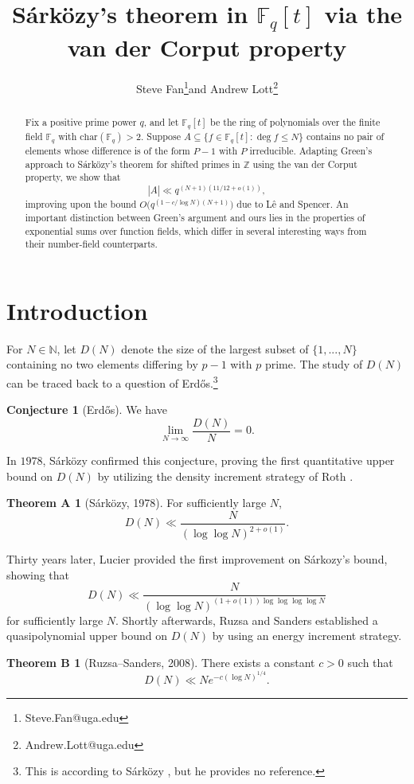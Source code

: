 \documentclass{article}
\title{Sárközy's theorem in $\mathbb{F}_q[t]$ via the van der Corput property}
\author{Steve Fan\thanks{Steve.Fan@uga.edu}\quad and Andrew Lott\thanks{Andrew.Lott@uga.edu}}
\affil{Department of Mathematics\\ University of Georgia\\ Athens, GA 30602}
\date{}
\theoremstyle{definition}
\newtheorem*{conj}{Conjecture}
\newtheorem*{thmB}{Theorem B}
\newtheorem*{thmA}{Theorem A}
\theoremstyle{definition}
\theoremstyle{remark}
\newcommand{\Z}{\mathbb{Z}}
\newcommand{\F}{\mathbb{F}_q[t]}
\newcommand{\1}{\mathbf{1}}
\numberwithin{equation}{section}
\begin{document}
\maketitle

\begin{abstract}
Fix a positive prime power $q$, and  let $\F$ be the ring of polynomials over the finite field $\mathbb{F}_q$ with $\text{char}(\mathbb{F}_q)>2$. Suppose $A \subseteq \{f \in \F : \deg f \leq N\}$ contains no pair of elements whose difference is of the form $P-1$ with $P$ irreducible. Adapting Green’s approach to Sárközy’s theorem for shifted primes in $\Z$ using the van der Corput property, we show that
\[
|A| \ll q^{(N+1)(11/12+o(1))},
\]
improving upon the bound $O\big(q^{(1-c/\log N)(N+1)}\big)$ due to L\^{e} and Spencer.  An important distinction between Green's argument and ours lies in the properties of exponential sums over function fields, which differ in several interesting ways from their number-field counterparts.  



\end{abstract}
\tableofcontents

\section{Introduction}

For $N\in \mathbb{N}$, let $D(N)$ denote the size of the largest subset of $\{1,...,N\}$ containing no two elements differing by $p-1$ with $p$ prime. The study of $D(N)$ can be traced back to a question of Erdős.\footnote{This is according to Sárközy \cite{SarkozyIII1978}, but he provides no reference.}

\begin{conj}[Erdős] We have
\[\lim_{N\to\infty}\frac{D(N)}{N}=0.\]
\end{conj}

In $1978$, Sárközy \cite{SarkozyIII1978} confirmed this conjecture, proving the first quantitative upper bound on $D(N)$ by utilizing the density increment strategy of Roth \cite{SarkozyIII1978}. 
\begin{thmA}[Sárközy, 1978] For sufficiently large $N$,
\[D(N)\ll\frac{N}{(\log\log N)^{2+o(1)}}.\]
\end{thmA}

Thirty years later, Lucier \cite{Lucier08} provided the first improvement on S\'{a}rkozy's bound, showing that 
\[D(N)\ll \frac{N}{(\log\log N)^{(1+o(1))\log\log\log\log N}}\]
for sufficiently large $N$. Shortly afterwards, Ruzsa and Sanders \cite{RuzsaSanders2008} established a quasipolynomial upper bound on $D(N)$ by using an energy increment strategy. 
\begin{thmB}[Ruzsa--Sanders, 2008]
There exists a constant $c>0$ such that 
\[D(N)\ll Ne^{-c(\log N)^{1\slash 4}}.\]
\end{thmB}
\end{document}
